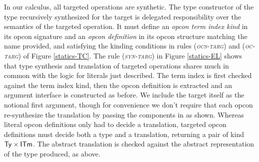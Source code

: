 \documentclass[9pt,preprint]{sigplanconf}
\newcommand{\rulename}[1]{({\textsc{\textsl{#1}}})}
\begin{document}
In our calculus, all targeted operations are synthetic. The type constructor of the type recursively synthesized for the target is delegated responsibility over the semantics of the targeted operation. It must define an \emph{opcon term index kind} in its opcon signature and an \emph{opcon definition} in its opcon structure matching the name provided, and satisfying the kinding conditions in rules \rulename{ocs-targ} and \rulename{oc-targ} of Figure \ref{statics-TC}. The rule \rulename{syn-targ} in Figure \ref{statics-EL} shows that type synthesis and translation of targeted operations shares much in common with the logic for literals just described. The term index is first checked against the term index kind, then the opcon definition is extracted and an argument interface is constructed as before. We include the target itself as the notional first argument, though for convenience we don't require that each opcon re-synthesize the translation by passing the components in as shown. 
Whereas literal opcon definitions only had to decide a translation, targeted opcon definitions must decide both a type and a translation, returning a pair of kind ${\sf Ty} \times {\sf ITm}$. The abstract translation is checked against the abstract representation of the type produced, as  above.%
\end{document}
